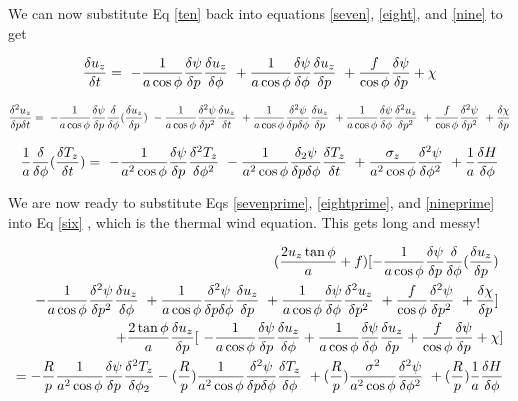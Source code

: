 \documentclass{article}
\begin{document}
We can now substitute Eq \ref{ten} back into equations \ref{seven},
\ref{eight}, and \ref{nine} to get

\begin{equation}
\frac{\delta u_z}{\delta t} = \
- \frac{1}{a\cos{\phi}} \frac{\delta \psi}{\delta p} \frac{\delta u_z}{\delta \phi} \
+ \frac{1}{a\cos{\phi}} \frac{\delta \psi}{\delta \phi} \frac{\delta u_z}{\delta p} \
+ \frac{f}{\cos{\phi}} \frac{\delta \psi}{\delta p} + \chi
\label{eightprime}
\end{equation}

\begin{equation}
\frac{\delta^2 u_z}{\delta p \delta t} = \
- \frac{1}{a\cos{\phi}} \frac{\delta \psi}{\delta p} \frac{\delta}{\delta \phi} (\frac{\delta u_z}{\delta p}) \
- \frac{1}{a\cos{\phi}} \frac{\delta^2 \psi}{\delta p^2} \frac{\delta u_z}{\delta t} \
+ \frac{1}{a\cos{\phi}} \frac{\delta^2 \psi}{\delta p \delta \phi} \frac{\delta u_z}{\delta p} \
+ \frac{1}{a\cos{\phi}} \frac{\delta \psi}{\delta \phi} \frac{\delta^2 u_z }{\delta p^2} \
+ \frac{f}{\cos \phi} \frac{\delta^2 \psi}{\delta p^2} \
+ \frac{\delta \chi}{\delta p}
\label{sevenprime}
\end{equation}

\begin{equation}
\frac{1}{a} \frac{\delta}{\delta \phi} (\frac{\delta T_z}{\delta t}) = \
- \frac{1}{a^2 \cos{\phi}} \frac{\delta \psi}{\delta p} \frac{\delta^2 T_z}{\delta \phi^2} \
- \frac{1}{a^2 \cos{\phi}} \frac{\delta_2 \psi}{\delta p \delta \phi} \frac{\delta T_z}{\delta t} \
+ \frac{\sigma_z}{a^2 \cos \phi} \frac{\delta^2 \psi}{\delta \phi^2} \
+ \frac{1}{a} \frac{\delta H}{\delta \phi}
\label{nineprime}
\end{equation}

We are now ready to substitute Eqs \ref{sevenprime}, \ref{eightprime}, and
\ref{nineprime} into Eq \ref{six} , which is the thermal wind equation.  This
gets long and messy!

\begin{eqnarray}
(\frac{2 u_z \tan \phi}{a} + f) [ - \frac{1}{a\cos{\phi}} \frac{\delta \psi}{\delta p} \frac{\delta}{\delta \phi} (\frac{\delta u_z}{\delta p}) \
\\
- \frac{1}{a\cos{\phi}} \frac{\delta^2 \psi}{\delta p^2} \frac{\delta u_z}{\delta \phi} \
+ \frac{1}{a\cos{\phi}} \frac{\delta^2 \psi}{\delta p \delta \phi} \frac{\delta u_z}{\delta p} \
+ \frac{1}{a\cos{\phi}} \frac{\delta \psi}{\delta \phi} \frac{\delta^2 u_z}{\delta p^2} \
+ \frac{f}{\cos \phi} \frac{\delta^2 \psi}{\delta p^2} \
+ \frac{\delta \chi}{\delta p} ] \
\nonumber\\
+ \frac{2 \tan \phi}{a} \frac{\delta u_z}{\delta p} [ \
- \frac{1}{a\cos{\phi}} \frac{\delta \psi}{\delta p} \frac{\delta u_z}{\delta \phi}
+ \frac{1}{a\cos{\phi}} \frac{\delta \psi}{\delta \phi} \frac{\delta u_z}{\delta p}
+ \frac{f}{\cos \phi} \frac{\delta \psi}{\delta p}
+ \chi ]
\nonumber\\
= - \frac{R}{p} \frac{1}{a^2 \cos{\phi}} \frac{\delta \psi}{\delta p} \frac{\delta^2 T_z}{\delta \phi_2}
- (\frac{R}{p}) \frac{1}{a^2 \cos{\phi}} \frac{\delta^2 \psi}{\delta p \delta \phi} \frac{\delta T_z}{\delta \phi} \
+ (\frac{R}{p}) \frac{\sigma^2}{a^2 \cos{\phi}} \frac{\delta^2 \psi}{\delta \phi^2} \
+ (\frac{R}{p}) \frac{1}{a} \frac{\delta H}{\delta \phi}
\end{eqnarray}
\end{document}
